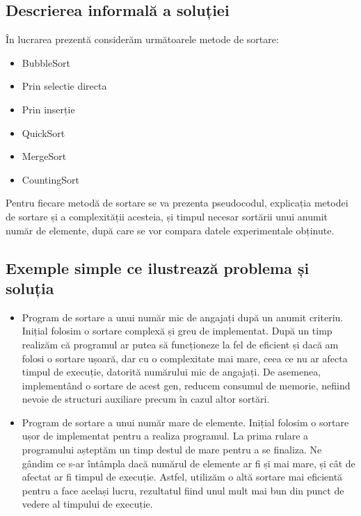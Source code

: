 \documentclass[12pt]{article}
\begin{document}
\subsection{Descrierea informală a soluției}
În lucrarea prezentă considerăm următoarele metode de sortare: 
\begin{itemize}
    \item BubbleSort
    \item Prin selectie directa
    \item Prin inserție
    \item QuickSort
    \item MergeSort
    \item CountingSort
\end{itemize}

Pentru fiecare metodă de sortare se va prezenta pseudocodul, explicația metodei de sortare și a complexității acesteia, și timpul necesar sortării unui anumit număr de elemente, după care se vor compara datele experimentale obținute.

\subsection{Exemple simple ce ilustrează problema  și soluția}
\begin{itemize}
   

\item Program de sortare a unui număr mic de angajați după un anumit criteriu. Inițial folosim o sortare complexă și greu de implementat. După un timp realizăm că programul ar putea să funcționeze la fel de eficient și dacă am folosi o sortare ușoară, dar cu o complexitate mai mare, ceea ce nu ar afecta timpul de execuție, datorită numărului mic de angajați. De asemenea, implementând o sortare de acest gen, reducem consumul de memorie, nefiind nevoie de structuri auxiliare precum în cazul altor sortări.
\item Program de sortare a unui număr mare de elemente. Inițial folosim o sortare ușor de implementat pentru a realiza programul. La prima rulare a programului așteptăm un timp destul de mare pentru a se finaliza. Ne gândim ce s-ar întâmpla dacă numărul de elemente ar fi și mai mare, și cât de afectat ar fi timpul de execuție. Astfel, utilizăm o altă sortare mai eficientă pentru a face același lucru, rezultatul fiind unul mult mai bun din punct de vedere al timpului de execuție.
\end{itemize}
\end{document}
